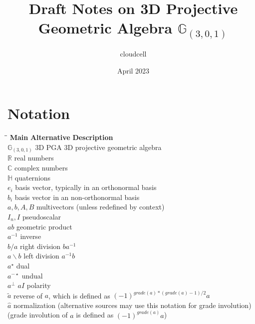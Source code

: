 \documentclass{article}
\title{Draft Notes on 3D Projective Geometric Algebra $\mathbb{G}_{(3,0,1)}$}
\author{cloudcell}
\date{April 2023}
\newcommand{\mycaption}[2][nolabel]{%
  \ifthenelse{\equal{#1}{label}}{\refstepcounter{table}\caption{#2}\label{table:\thetable}}{\caption*{#2}}%
}
\begin{document}
\maketitle  

\section{Notation}

\begin{tabbing}
    \hspace*{2cm}\=\hspace*{3cm}\=\kill
    \textbf{Main} \> \textbf{Alternative} \> \textbf{Description}\\
    $\mathbb{G}_{(3,0,1)}$ \> 3D PGA \> 3D projective geometric algebra\\
    $\mathbb{R}$ \> \> real numbers\\
    $\mathbb{C}$ \> \> complex numbers\\
    $\mathbb{H}$ \> \> quaternions\\
    $e_{i}$ \> \> basis vector, typically in an orthonormal basis\\
    $b_{i}$ \> \> basis vector in an non-orthonormal basis\\
    $a, b, A, B$ \> \> multivectors (unless redefined by context)\\
    $I_n, I$ \> \> pseudoscalar\\
    $ab$ \> \> geometric product\\
    $a^{-1}$ \> \> inverse\\
    $b / a$ \> \> right division $ba^{-1}$\\
    $a \backslash b$ \> \> left division $a^{-1}b$\\
    $a^{\star}$ \> \> dual\\
    $a^{-\star}$ \> \> undual\\
    $a^{\bot}$ \> $aI$ \> polarity\\
    $\tilde{a}$ \> \> reverse of $a$, which is defined as $(-1)^{grade(a)*(grade(a)-1)/2}a$ \\
    $\hat{a}$ \> \> normalization (alternative sources may use this notation for grade involution)\\
    \> \> (grade involution of $a$ is defined as $(-1)^{grade(a)}a$) \\

\end{tabbing}
\end{document}
